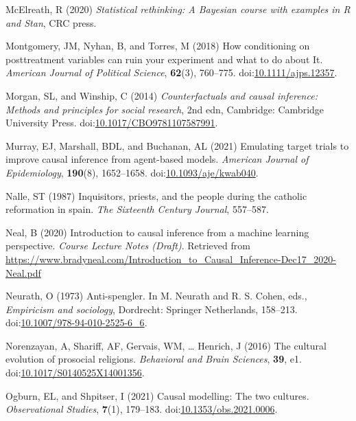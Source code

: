 \documentclass[
  single column]{article}
\newlength{\cslhangindent}
\newenvironment{CSLReferences}[2] %
 {\begin{list}{}{%
  \setlength{\itemindent}{0pt}
  \setlength{\leftmargin}{0pt}
  \setlength{\parsep}{0pt}
  \ifodd #1
   \setlength{\leftmargin}{\cslhangindent}
   \setlength{\itemindent}{-1\cslhangindent}
  \fi
  \setlength{\itemsep}{#2\baselineskip}}}
 {\end{list}}
\begin{document}
\begin{CSLReferences}{1}{0}
McElreath, R (2020) \emph{Statistical rethinking: A {B}ayesian course
with examples in {R} and {S}tan}, CRC press.

Montgomery, JM, Nyhan, B, and Torres, M (2018) How conditioning on
posttreatment variables can ruin your experiment and what to do about
It. \emph{American Journal of Political Science}, \textbf{62}(3),
760--775.
doi:\href{https://doi.org/10.1111/ajps.12357}{10.1111/ajps.12357}.

Morgan, SL, and Winship, C (2014) \emph{Counterfactuals and causal
inference: Methods and principles for social research}, 2nd edn,
Cambridge: Cambridge University Press.
doi:\href{https://doi.org/10.1017/CBO9781107587991}{10.1017/CBO9781107587991}.

Murray, EJ, Marshall, BDL, and Buchanan, AL (2021) Emulating target
trials to improve causal inference from agent-based models.
\emph{American Journal of Epidemiology}, \textbf{190}(8), 1652--1658.
doi:\href{https://doi.org/10.1093/aje/kwab040}{10.1093/aje/kwab040}.

Nalle, ST (1987) Inquisitors, priests, and the people during the
catholic reformation in spain. \emph{The Sixteenth Century Journal},
557--587.

Neal, B (2020) Introduction to causal inference from a machine learning
perspective. \emph{Course Lecture Notes (Draft)}. Retrieved from
\url{https://www.bradyneal.com/Introduction_to_Causal_Inference-Dec17_2020-Neal.pdf}

Neurath, O (1973) Anti-spengler. In M. Neurath and R. S. Cohen, eds.,
\emph{Empiricism and sociology}, Dordrecht: Springer Netherlands,
158--213.
doi:\href{https://doi.org/10.1007/978-94-010-2525-6_6}{10.1007/978-94-010-2525-6\_6}.

Norenzayan, A, Shariff, AF, Gervais, WM, \ldots{} Henrich, J (2016) The
cultural evolution of prosocial religions. \emph{Behavioral and Brain
Sciences}, \textbf{39}, e1.
doi:\href{https://doi.org/10.1017/S0140525X14001356}{10.1017/S0140525X14001356}.

Ogburn, EL, and Shpitser, I (2021) Causal modelling: The two cultures.
\emph{Observational Studies}, \textbf{7}(1), 179--183.
doi:\href{https://doi.org/10.1353/obs.2021.0006}{10.1353/obs.2021.0006}.


\end{CSLReferences}
\end{document}
